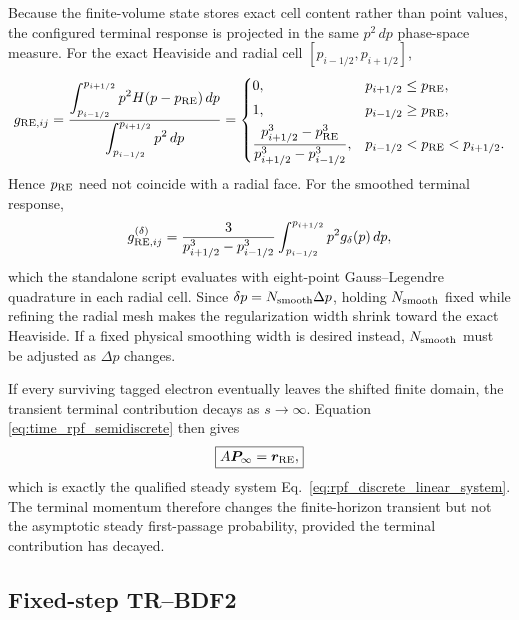 \documentclass[11pt]{article}
\begin{document}
Because the finite-volume state stores exact cell content rather than point values, the
configured terminal response is projected in the same $p^2\,dp$ phase-space measure.  For
the exact Heaviside and radial cell $[p_{i-1/2},p_{i+1/2}]$,
\begin{equation}
 g_{{\rm RE},ij}
 =\frac{\displaystyle
   \int_{p_{i-1/2}}^{p_{i+1/2}}p^2H(p-p_{\rm RE})\,dp}
  {\displaystyle
   \int_{p_{i-1/2}}^{p_{i+1/2}}p^2\,dp}
 =
 \begin{cases}
  0, & p_{i+1/2}\le p_{\rm RE},\\[3pt]
  1, & p_{i-1/2}\ge p_{\rm RE},\\[3pt]
  \dfrac{p_{i+1/2}^3-p_{\rm RE}^3}
        {p_{i+1/2}^3-p_{i-1/2}^3},
     & p_{i-1/2}<p_{\rm RE}<p_{i+1/2}.
 \end{cases}
 \label{eq:time_rpf_terminal_projection}
\end{equation}
Hence $p_{\rm RE}$ need not coincide with a radial face.  For the smoothed terminal response,
\begin{equation}
 g_{{\rm RE},ij}^{(\delta)}
 =\frac{3}{p_{i+1/2}^3-p_{i-1/2}^3}
   \int_{p_{i-1/2}}^{p_{i+1/2}}
   p^2 g_\delta(p)\,dp,
 \label{eq:time_rpf_terminal_smooth_projection}
\end{equation}
which the standalone script evaluates with eight-point Gauss--Legendre quadrature in each
radial cell.  Since $\delta p=N_{\rm smooth}\Delta p$, holding $N_{\rm smooth}$ fixed while
refining the radial mesh makes the regularization width shrink toward the exact Heaviside.
If a fixed physical smoothing width is desired instead, $N_{\rm smooth}$ must be adjusted as
$\Delta p$ changes.

If every surviving tagged electron eventually leaves the shifted finite domain, the
transient terminal contribution decays as $s\rightarrow\infty$.  Equation
\eqref{eq:time_rpf_semidiscrete} then gives
\begin{equation}
 \boxed{A\bm P_\infty=\bm r_{\rm RE},}
 \label{eq:time_rpf_steady_limit}
\end{equation}
which is exactly the qualified steady system
Eq.~\eqref{eq:rpf_discrete_linear_system}.  The terminal momentum therefore changes the
finite-horizon transient but not the asymptotic steady first-passage probability, provided
the terminal contribution has decayed.

\subsection{Fixed-step TR--BDF2}
\label{sec:time_adjoint_integrator}
\end{document}
